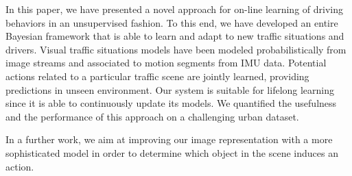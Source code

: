 In this paper, we have presented a novel approach for on-line learning of
driving behaviors in an unsupervised fashion. To this end, we have developed an
entire Bayesian framework that is able to learn and adapt to new traffic
situations and drivers. Visual traffic situations models have been modeled
probabilistically from image streams and associated to motion segments from
IMU data. Potential actions related to a particular traffic scene are jointly
learned, providing predictions in unseen environment. Our system is suitable
for lifelong learning since it is able to continuously update its models. We
quantified the usefulness and the performance of this approach on a challenging
urban dataset.

In a further work, we aim at improving our image representation with a more
sophisticated model in order to determine which object in the scene induces
an action.
